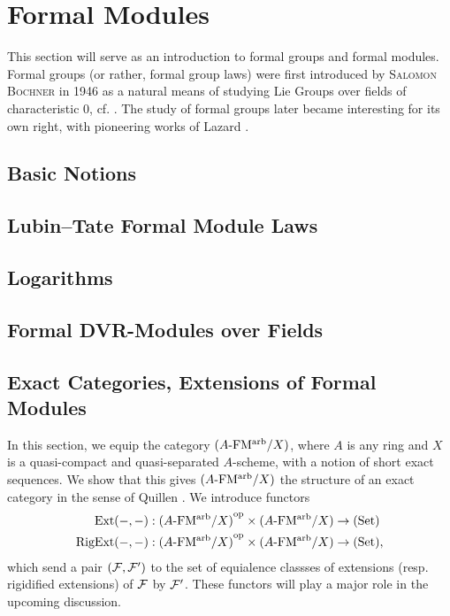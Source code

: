 \documentclass[../main.tex]{subfiles}
\begin{document}
\section{Formal Modules}
This section will serve as an introduction to formal groups and 
formal modules. Formal groups (or rather, formal group laws) were first
introduced by \textsc{Salomon Bochner} in 1946 as a natural means of studying Lie
Groups over fields of characteristic $0$, cf. \cite{Bochner1946FGrps}. 
The study of formal groups later became interesting for its own right, 
with pioneering works of Lazard \cite{Lazard1955FGrps}. 

\subsection{Basic Notions} 
\label{sub:Basic Notions}


\subsection{Lubin--Tate Formal Module Laws} %
\label{sub:Lubin--Tate Formal Module Laws}


\subsection{Logarithms} %
\label{sub:Logarithms}


\subsection{Formal DVR-Modules over Fields} %
\label{sub:Formal DVR-Modules over Fields}


\subsection{Exact Categories, Extensions of Formal Modules} %
 \label{sub:Exact Categories Extensions of Formal Modules}

In this section, we equip the category ${({A}\text-\mathrm{FM^{arb}}/{X})}$, where 
$A$ is any ring and $X$ is a quasi-compact and quasi-separated $A$-scheme,
with a notion of short exact sequences. We show that this gives ${({A}\text-\mathrm{FM^{arb}}/{X})}$ 
the structure of an exact category in the sense of 
Quillen \cite[Appendix A]{keller1990chain}. We introduce functors
\begin{align*}
  \operatorname{Ext}(-,-)&: {({A}\text-\mathrm{FM^{arb}}/{X})}^{\mathrm{op}} \times {({A}\text-\mathrm{FM^{arb}}/{X})} \to {(\mathrm{Set})} \\
  \operatorname {RigExt}(-,-)&: {({A}\text-\mathrm{FM^{arb}}/{X})}^{\mathrm{op}} \times {({A}\text-\mathrm{FM^{arb}}/{X})} \to {(\mathrm{Set})},
\end{align*}
which send a pair $(\mathcal{F}, \mathcal{F}')$ to the set of equialence classses of 
extensions (resp. rigidified extensions) of $\mathcal{F}$ by $\mathcal{F}'$. These functors
will play a major role in the upcoming discussion.
\end{document}
